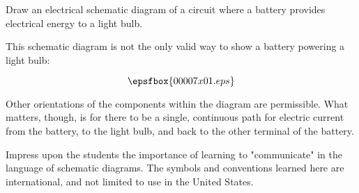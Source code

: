 

Draw an electrical schematic diagram of a circuit where a battery provides electrical energy to a light bulb.







This schematic diagram is not the only valid way to show a battery powering a light bulb:

$$\epsfbox{00007x01.eps}$$

Other orientations of the components within the diagram are permissible.  What matters, though, is for there to be a single, continuous path for electric current from the battery, to the light bulb, and back to the other terminal of the battery.







Impress upon the students the importance of learning to "communicate" in the language of schematic diagrams.  The symbols and conventions learned here are international, and not limited to use in the United States.  




